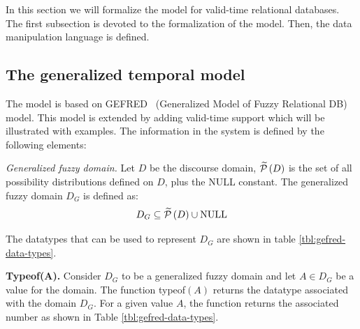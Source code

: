 %
%

In this section we will formalize the model for valid-time relational databases. The first subsection is devoted to the formalization of the model. Then, the data manipulation language is defined.

\subsection{\label{subsec:temporal-model}The generalized temporal model}
The model is based on GEFRED~\cite{Medina1994} (Generalized Model of Fuzzy Relational DB) model. This model is extended by adding valid-time support which will be illustrated with examples. The information in the system is defined by the following elements:

\begin{definition}
\label{def:generalized-fuzzy-domain}
\emph{Generalized fuzzy domain.}
Let $D$ be the discourse domain, $\widetilde {\mathcal{P}}\left(D \right)$ is the set of all possibility distributions defined on $D$, plus the NULL constant. The generalized fuzzy domain $D_G$ is defined as:
\begin{equation}
\label{eq:generalized-fuzzy-domain}
D_G \subseteq \widetilde {\mathcal{P}}\left(D \right)\cup \text{NULL}
\end{equation}
\end{definition}
The datatypes that can be used to represent $D_G$ are shown in table \ref{tbl:gefred-data-types}. 

\begin{definition}
\label{def:typeof-domain}
\textbf{Typeof(A).}
Consider $D_G$ to be a generalized fuzzy domain and let $A \in D_G$ be a value for the domain. 
The function typeof$\left(A \right)$ returns the datatype associated with the domain $D_G$. For a given value $A$, the function returns the associated number as shown in Table \ref{tbl:gefred-data-types}.
\end{definition}



